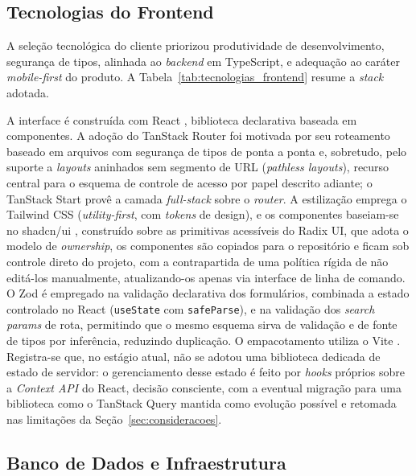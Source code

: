 \documentclass[12pt,openright,oneside,a4paper]{article}
\begin{document}
\subsection{Tecnologias do Frontend}

A seleção tecnológica do cliente priorizou produtividade de desenvolvimento, segurança de tipos, alinhada ao \textit{backend} em TypeScript, e adequação ao caráter \textit{mobile-first} do produto. A Tabela~\ref{tab:tecnologias_frontend} resume a \textit{stack} adotada.



A interface é construída com React \cite{react}, biblioteca declarativa baseada em componentes. A adoção do TanStack Router \cite{tanstackrouter} foi motivada por seu roteamento baseado em arquivos com segurança de tipos de ponta a ponta e, sobretudo, pelo suporte a \textit{layouts} aninhados sem segmento de URL (\textit{pathless layouts}), recurso central para o esquema de controle de acesso por papel descrito adiante; o TanStack Start \cite{tanstackstart} provê a camada \textit{full-stack} sobre o \textit{router}. A estilização emprega o Tailwind CSS \cite{tailwind} (\textit{utility-first}, com \textit{tokens} de design), e os componentes baseiam-se no shadcn/ui \cite{shadcnui}, construído sobre as primitivas acessíveis do Radix UI, que adota o modelo de \textit{ownership}, os componentes são copiados para o repositório e ficam sob controle direto do projeto, com a contrapartida de uma política rígida de não editá-los manualmente, atualizando-os apenas via interface de linha de comando. O Zod \cite{zod} é empregado na validação declarativa dos formulários, combinada a estado controlado no React (\texttt{useState} com \texttt{safeParse}), e na validação dos \textit{search params} de rota, permitindo que o mesmo esquema sirva de validação e de fonte de tipos por inferência, reduzindo duplicação. O empacotamento utiliza o Vite \cite{vite}. Registra-se que, no estágio atual, não se adotou uma biblioteca dedicada de estado de servidor: o gerenciamento desse estado é feito por \textit{hooks} próprios sobre a \textit{Context API} do React, decisão consciente, com a eventual migração para uma biblioteca como o TanStack Query mantida como evolução possível e retomada nas limitações da Seção~\ref{sec:consideracoes}.

\subsection{Banco de Dados e Infraestrutura}
\label{sec:tec-infra}
\end{document}
